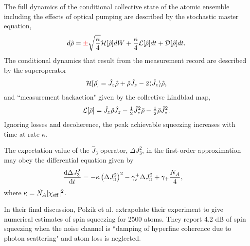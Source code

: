 \documentclass[preprint,aps,pra,onecolumn]{revtex4-1} %
\newcommand{\change}[1]{{\color{RoyalBlue} #1}}
\newcommand{\comment}[1]{{\color{Maroon} #1}}
\newcommand{\error}[1]{{\color{red} #1}}
\begin{document}
The full dynamics of the conditional collective state of the atomic ensemble including the effects of optical pumping are described by the stochastic master equation,
	\begin{align}
		d \hat{\rho} = \error{\pm}\sqrt{\frac{\kappa}{4}} \mathcal{H}[\hat{\rho}] dW + \frac{\kappa}{4} \mathcal{L}[\hat{\rho}] dt + \mathcal{D} [\hat{\rho}] dt.
	\end{align}
The conditional dynamics that result from the measurement record are described by the superoperator
	\begin{align}
		\mathcal{H}[\hat{\rho}] = \hat{J}_z \hat{\rho} + \hat{\rho} \hat{J}_z - 2 \langle{\hat{J}_z}\rangle \hat{\rho},
	\end{align}
and ``measurement backaction" given by the collective Lindblad map, 
	\begin{align}
		\mathcal{L}[\hat{\rho}] = \hat{J}_z \hat{\rho} \hat{J}_z - \mbox{$\frac{1}{2}$} \hat{J}_z^2 \hat{\rho} - \mbox{$\frac{1}{2}$} \hat{\rho}  \hat{J}_z^2 .
	\end{align}
Ignoring losses and decoherence, the peak achievable squeezing increases with time at rate $\kappa$.  	

\change{		
The expectation value of the $ \hat{J}_3 $ operator, $ \Delta J_3^2 $, in the first-order approximation may obey the differential equation given by 
\begin{align}
\frac{{\mathrm d} {\Delta J_3^2}}{{\mathrm d}t} &= -\kappa \left(\Delta J_3^2 \right)^2 -\gamma_s^+ \Delta J_3^2 + \gamma_+\frac{N_A}{4},
\end{align}
where $ \kappa=\dot{N}_A |\chi_{\rm eff}|^2$. 

}
\comment{ In their final discussion, Polzik et al. \cite{beguin_generation_2014} extrapolate their experiment to give numerical estimates of spin squeezing for 2500 atoms.  They report 4.2 dB of spin squeezing when the noise channel is ``damping of hyperfine coherence due to photon scattering" and atom loss is neglected. }
\end{document}
